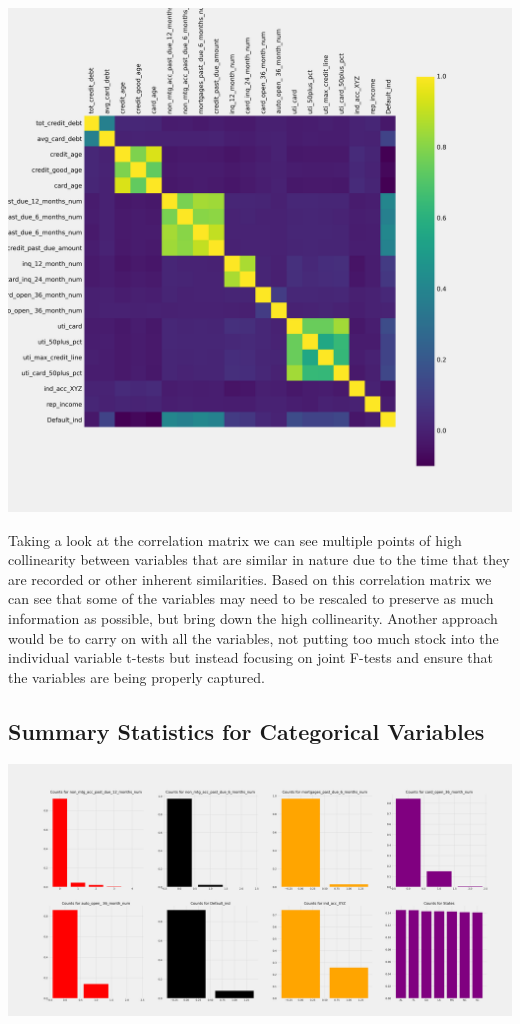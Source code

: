 \documentclass[12pt]{article}
\begin{document}
	\begin{center}
		\includegraphics[scale = 0.3]{../notebooks/CorMat.png}
	\end{center}
	
	Taking a look at the correlation matrix we can see multiple points of high collinearity between variables that are similar in nature due to the time that they are recorded or other inherent similarities. Based on this correlation matrix we can see that some of the variables may need to be rescaled to preserve as much information as possible, but bring down the high collinearity. Another approach would be to carry on with all the variables, not putting too much stock into the individual variable t-tests but instead focusing on joint F-tests and ensure that the variables are being properly captured. 
	
	\subsection{Summary Statistics for Categorical Variables}
	
	\begin{center}
		\includegraphics[scale=0.15]{../notebooks/counts.png}
	\end{center}
	
\end{document}
